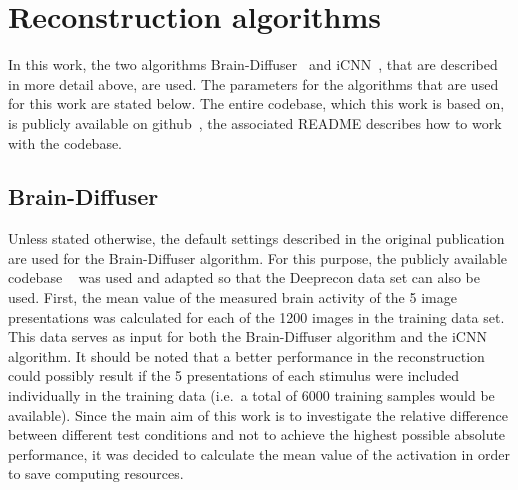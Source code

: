 


\section{Reconstruction algorithms}

In this work, the two algorithms Brain-Diffuser~\cite{ozcelikNaturalSceneReconstruction2023} and iCNN~\cite{shenDeepImageReconstruction2019}, that are described in more detail above, are used. The parameters for the algorithms that are used for this work are stated below. The entire codebase, which this work is based on, is publicly available on github~\cite{mildenbergerKamitaniLabBrain_diffuser}, the associated README describes how to work with the codebase. 

\subsection{Brain-Diffuser}
Unless stated otherwise, the default settings described in the original publication are used for the Brain-Diffuser algorithm. For this purpose, the publicly available codebase ~\cite{ozcelikOzcelikfuBraindiffuser2025} was used and adapted so that the Deeprecon data set can also be used.
First, the mean value of the measured brain activity of the 5 image presentations was calculated for each of the 1200 images in the training data set. This data serves as input for both the Brain-Diffuser algorithm and the iCNN algorithm. It should be noted that a better performance in the reconstruction could possibly result if the 5 presentations of each stimulus were included individually in the training data (i.e.\ a total of 6000 training samples would be available). Since the main aim of this work is to investigate the relative difference between different test conditions and not to achieve the highest possible absolute performance, it was decided to calculate the mean value of the activation in order to save computing resources.

